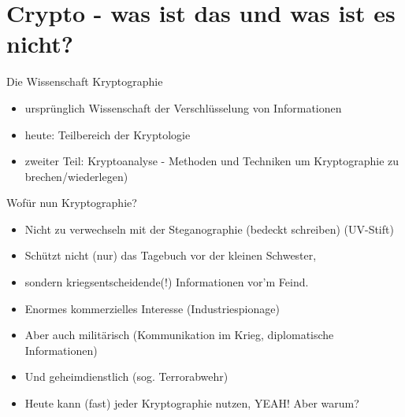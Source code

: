 \section{Crypto - was ist das und was ist es nicht?}
  \begin{frame}{Die Wissenschaft Kryptographie}
    \begin{itemize}
      \item{ursprünglich Wissenschaft der Verschlüsselung von Informationen}
      \item{heute: Teilbereich der Kryptologie}
      \item{zweiter Teil: Kryptoanalyse - Methoden und Techniken um Kryptographie zu brechen/wiederlegen)}
    \end{itemize}
  \end{frame}
  \begin{frame}{Wofür nun Kryptographie?}
    \begin{itemize}
      \item{Nicht zu verwechseln mit der Steganographie (bedeckt schreiben) (UV-Stift)} 
      \item{Schützt nicht (nur) das Tagebuch vor der kleinen Schwester,}
      \item{sondern kriegsentscheidende(!) Informationen vor'm Feind.}
      \item{Enormes kommerzielles Interesse (Industriespionage)}
      \item{Aber auch militärisch (Kommunikation im Krieg, diplomatische Informationen)}
      \item{Und geheimdienstlich (sog. Terrorabwehr)}
      \item{Heute kann (fast) jeder Kryptographie nutzen, YEAH! Aber warum?}
    \end{itemize}
  \end{frame}
